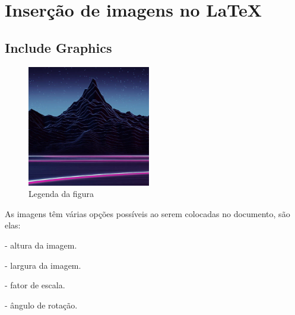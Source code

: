 \documentclass{report}
\begin{document}
    \part[Imagens]{Inserção de imagens no \LaTeX}\label{part:imagens-graphics}
        
        \chapter{Include Graphics}\label{chap:include-graphics}
            \begin{figure}[h]\label{imagem-exemplo}
                \center
                \includegraphics[height=150pt]{test}
                \caption{Legenda da figura}
            \end{figure}
            As imagens têm várias opções possíveis ao serem colocadas no documento, são elas:
            \begin{description}\label{opcoes-imagem-lista}
                \item[height] - altura da imagem.
                \item[width] - largura da imagem.
                \item[scale] - fator de escala.
                \item[angle] - ângulo de rotação.
            \end{description}
            
\end{document}
